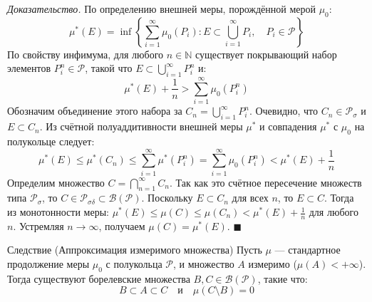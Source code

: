 \documentclass[12pt,a4paper]{article}
\newenvironment{Proof}[1][Доказательство]{\vspace{0.5em}\noindent\textit{#1.}\hspace{0.5em}\ignorespaces}{\hfill$\blacksquare$\vspace{1em}}
\begin{document}
\begin{Proof}
По определению внешней меры, порождённой мерой $\mu_0$:
$$ \mu^*(E) = \inf \left\{ \sum\limits_{i=1}^{\infty} \mu_0(P_i) : E \subset \bigcup\limits_{i=1}^{\infty} P_i, \quad P_i \in \mathcal{P} \right\} $$
По свойству инфимума, для любого $n \in \mathbb{N}$ существует покрывающий набор элементов $P_i^n \in \mathcal{P}$, такой что $E \subset \bigcup\limits_{i=1}^{\infty} P_i^n$ и:
$$ \mu^*(E) + \frac{1}{n} > \sum\limits_{i=1}^{\infty} \mu_0(P_i^n) $$
Обозначим объединение этого набора за $C_n = \bigcup\limits_{i=1}^{\infty} P_i^n$. Очевидно, что $C_n \in \mathcal{P}_\sigma$ и $E \subset C_n$. 
Из счётной полуаддитивности внешней меры $\mu^*$ и совпадения $\mu^*$ с $\mu_0$ на полукольце следует:
$$ \mu^*(E) \le \mu^*(C_n) \le \sum\limits_{i=1}^{\infty} \mu^*(P_i^n) = \sum\limits_{i=1}^{\infty} \mu_0(P_i^n) < \mu^*(E) + \frac{1}{n} $$
Определим множество $C = \bigcap\limits_{n=1}^{\infty} C_n$. Так как это счётное пересечение множеств типа $\mathcal{P}_\sigma$, то $C \in \mathcal{P}_{\sigma\delta} \subset \mathcal{B}(\mathcal{P})$.
Поскольку $E \subset C_n$ для всех $n$, то $E \subset C$. 
Тогда из монотонности меры: $\mu^*(E) \le \mu(C) \le \mu(C_n) < \mu^*(E) + \frac{1}{n}$ для любого $n$. Устремляя $n \to \infty$, получаем $\mu(C) = \mu^*(E)$.
\end{Proof}

\begin{Theorem}{Следствие (Аппроксимация измеримого множества)}{}
Пусть $\mu$ — стандартное продолжение меры $\mu_0$ с полукольца $\mathcal{P}$, и множество $A$ измеримо ($\mu(A) < +\infty$). Тогда существуют борелевские множества $B, C \in \mathcal{B}(\mathcal{P})$, такие что:
$$ B \subset A \subset C \quad \text{и} \quad \mu(C \setminus B) = 0 $$
\end{Theorem}
\end{document}
